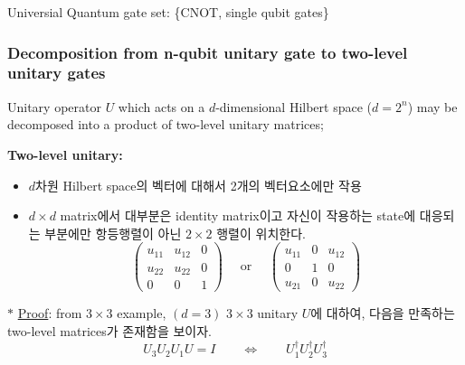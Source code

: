\documentclass[9pt]{beamer}
\begin{document}
    \begin{section}{Universial Quantum gate set: \{CNOT, single qubit gates\}}
        \begin{frame}
            \frametitle{Decomposition from n-qubit unitary gate to two-level unitary gates}
            \begin{theorem}\label{thr:two-level de}
                Unitary operator $U$ which acts on a $d$-dimensional Hilbert space ($d = 2^n$) may be decomposed into a product of \alert{two-level unitary matrices};
            \end{theorem}
            \vspace{0.2cm}
            \textbf{Two-level unitary:}
            \begin{itemize}
                \item $d$차원 Hilbert space의 벡터에 대해서 \alert{2개의} 벡터요소에만 작용
                \item $d\times d$ matrix에서 대부분은 identity matrix이고 자신이 작용하는 state에 대응되는 부분에만 항등행렬이 아닌 $2\times 2$ 행렬이 위치한다. 
                $$\begin{pmatrix} u_{11} & u_{12} & 0 \\ u_{22} & u_{22} & 0 \\ 0 & 0 & 1  \end{pmatrix} \quad  \text{ or } \quad \begin{pmatrix} u_{11} & 0  & u_{12} \\ 0 & 1 & 0 \\ u_{21} & 0 & u_{22}  \end{pmatrix}$$ 
            \end{itemize}

            \vspace{0.4cm}
            $\ast$ \underline{Proof}: from $3\times 3$ example, $(d=3)$
            $3\times 3$ unitary $U$에 대하여, 다음을 만족하는 two-level matrices가 존재함을 보이자.
            $$ U_3U_2U_1 U = I \qquad \Leftrightarrow \qquad U_1^\dagger U_2^\dagger U_3^\dagger$$
            

\end{frame}
\end{section}
\end{document}
